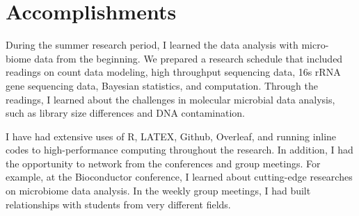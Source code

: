 \documentclass[12pt]{article}
\begin{document}
\section{Accomplishments}

During the summer research period, I learned the data analysis with micro- biome data from the beginning. We prepared a research schedule that included readings on count data modeling, high throughput sequencing data, 16s rRNA gene sequencing data, Bayesian statistics, and computation. Through the readings, I learned about the challenges in molecular microbial data analysis, such as library size differences and DNA contamination. 

I have had extensive uses of R, LATEX, Github, Overleaf, and running inline codes to high-performance computing throughout the research. 
In addition, I had the opportunity to network from the conferences and group meetings. For example, at the Bioconductor conference, I learned about cutting-edge researches on microbiome data analysis. In the weekly group meetings, I had built relationships with students from very different fields. 

\newpage


\end{document}
